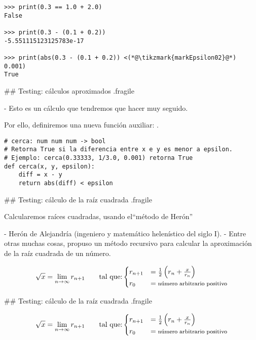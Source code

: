 \begin{lstlisting}
>>> print(0.3 == 1.0 + 2.0)
False

>>> print(0.3 - (0.1 + 0.2))
-5.551115123125783e-17

>>> print(abs(0.3 - (0.1 + 0.2)) <(*@\tikzmark{markEpsilon02}@*) 0.001)
True
\end{lstlisting}


## Testing: cálculos aproximados {.fragile}

- Esto es un cálculo que tendremos que hacer muy seguido.

\bgnblockidea
Por ello, definiremos una nueva función auxiliar: .
\trmblockidea

\vfill

\begin{lstlisting}[style=frame02]
# cerca: num num num -> bool
# Retorna True si la diferencia entre x e y es menor a epsilon.
# Ejemplo: cerca(0.33333, 1/3.0, 0.001) retorna True
def cerca(x, y, epsilon):
    diff = x - y
    return abs(diff) < epsilon
\end{lstlisting}

## Testing: cálculo de la raíz cuadrada {.fragile}

\bgnblockgood
{} Calcularemos raíces cuadradas, usando el\newline ``método de Herón''
\trmblockgood

- Herón de Alejandría (ingeniero y matemático helenístico del siglo I).
- Entre otras muchas cosas, propuso un método recursivo para calcular la aproximación de la raíz cuadrada de un número.

\pause

$$ \sqrt{x} = \lim_{n \to \infty} r_{n+1} \qquad \text{tal que:}  \begin{cases} r_{n+1} & = \frac{1}{2} \left(r_n + \frac{x}{r_n}\right) \\ r_0 & = \text{\footnotesize{número arbitrario positivo}} \\ \end{cases} $$

## Testing: cálculo de la raíz cuadrada {.fragile}

\vspace{-3ex}
$$ \sqrt{x} = \lim_{n \to \infty} r_{n+1} \qquad \text{tal que:}  \begin{cases} r_{n+1} & = \frac{1}{2} \left(r_n + \frac{x}{r_n}\right) \\ r_0 & = \text{\footnotesize{número arbitrario positivo}} \\ \end{cases} $$

